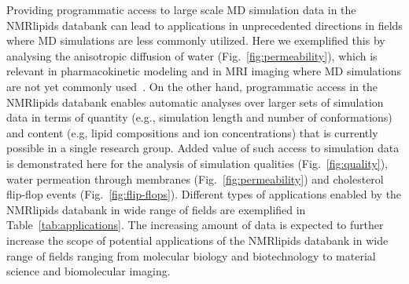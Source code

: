 \documentclass[fleqn,10pt]{wlscirep}
\begin{document}
Providing programmatic access to large scale MD simulation data in the NMRlipids databank can lead to applications in unprecedented directions in fields where MD simulations are less commonly utilized. Here we exemplified this by analysing the anisotropic diffusion of water (Fig.~\ref{fig:permeability}), which is relevant in pharmacokinetic modeling and in MRI imaging where MD simulations are not yet commonly used~\cite{nitsche19,topgaard20}. 
On the other hand, programmatic access in the NMRlipids databank enables automatic analyses over larger sets of simulation data in terms of quantity (e.g., simulation length and number of conformations) and content (e.g, lipid compositions and ion concentrations) that is currently possible in a single research group. Added value of such access to simulation data is demonstrated here for the analysis of simulation qualities (Fig.~\ref{fig:quality}), water permeation through membranes (Fig.~\ref{fig:permeability}) and cholesterol flip-flop events (Fig.~\ref{fig:flip-flops}). 
Different types of applications enabled by the NMRlipids databank in wide range of fields are exemplified in Table~\ref{tab:applications}. The increasing amount of data is expected to further increase the scope of potential applications of the NMRlipids databank in wide range of fields ranging from molecular biology and biotechnology to
material science and biomolecular imaging. 
\end{document}
